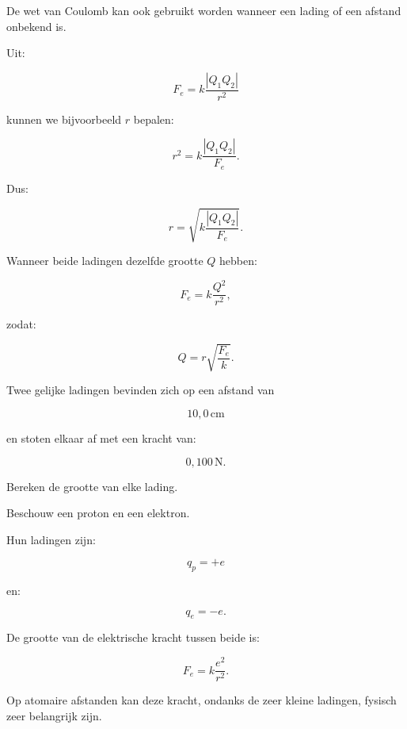 \documentclass{ximera}
\begin{document}


De wet van Coulomb kan ook gebruikt worden wanneer een lading of een
afstand onbekend is.

Uit:

\[
F_e=k\frac{|Q_1Q_2|}{r^2}
\]

kunnen we bijvoorbeeld $r$ bepalen:

\[
r^2=
k\frac{|Q_1Q_2|}{F_e}.
\]

Dus:

\[
\boxed{
r=
\sqrt{
k\frac{|Q_1Q_2|}{F_e}
}.
}
\]


Wanneer beide ladingen dezelfde grootte $Q$ hebben:

\[
F_e=k\frac{Q^2}{r^2},
\]

zodat:

\[
\boxed{
Q=r\sqrt{\frac{F_e}{k}}.
}
\]


\begin{oefening}{\oefB\ESS}

Twee gelijke ladingen bevinden zich op een afstand van

\[
10{,}0\,\mathrm{cm}
\]

en stoten elkaar af met een kracht van:

\[
0{,}100\,\mathrm N.
\]

Bereken de grootte van elke lading.

\end{oefening}




Beschouw een proton en een elektron.

Hun ladingen zijn:

\[
q_p=+e
\]

en:

\[
q_e=-e.
\]

De grootte van de elektrische kracht tussen beide is:

\[
F_e
=
k\frac{e^2}{r^2}.
\]

Op atomaire afstanden kan deze kracht, ondanks de zeer kleine
ladingen, fysisch zeer belangrijk zijn.
\end{document}
